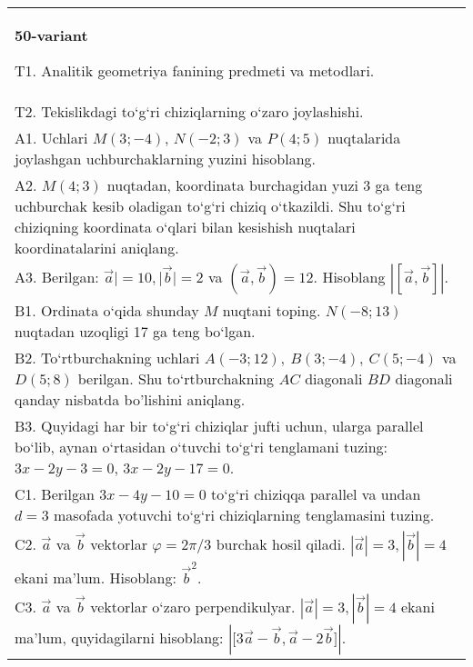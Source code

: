 \documentclass{article}
\begin{document}
\begin{tabular}{m{17cm}}
\textbf{50-variant}

T1. Analitik geometriya fanining predmeti va metodlari.
 \\
T2. 
Tekislikdagi to‘g‘ri chiziqlarning o‘zaro joylashishi.
 \\
A1. 
Uchlari $M (3;-4) $, $N (-2;3) $ va $P (4;5) $
nuqtalarida joylashgan uchburchaklarning yuzini hisoblang.
 \\
A2. 
$M (4;3) $ nuqtadan, koordinata burchagidan
yuzi 3 ga teng uchburchak kesib oladigan to‘g‘ri chiziq o‘tkazildi.
Shu to‘g‘ri chiziqning koordinata o‘qlari bilan kesishish nuqtalari
koordinatalarini aniqlang.
 \\
A3. 
Berilgan: $\overrightarrow{a}| = 10,|\overrightarrow{b}| = 2$ va
$\left(\overrightarrow{a},\overrightarrow{b} \right) = 12$. Hisoblang
$\left| \left\lbrack \overrightarrow{a},\overrightarrow{b} \right\rbrack \right|$.
 \\
B1. 
Ordinata o‘qida shunday $M$ nuqtani toping.
\(N (-8;13) \) nuqtadan uzoqligi 17 ga teng bo‘lgan.
 \\
B2. 
To‘rtburchakning uchlari
\(A (-3;12),\ B (3;-4),\ C (5;-4) \) va \(D (5;8) \) berilgan. Shu
to‘rtburchakning $AC$ diagonali $BD$ diagonali qanday
nisbatda bo'lishini aniqlang.
 \\
B3. 
Quyidagi har bir to‘g‘ri chiziqlar jufti uchun, ularga parallel
bo‘lib, aynan o‘rtasidan o‘tuvchi to‘g‘ri tenglamani tuzing: $3x-2y-3=0$, $3x-2y-17=0$.
 \\
C1. 
Berilgan \(3x-4y-10=0\) to‘g‘ri chiziqqa parallel va undan
$d=3$ masofada yotuvchi to‘g‘ri chiziqlarning tenglamasini tuzing.
 \\
C2. 
$\vec{a}$ va $\vec{b}$ vektorlar $\varphi = 2\pi/3$ burchak hosil qiladi. $|\vec{a}| = 3,|\vec{b}| = 4$ ekani ma’lum. Hisoblang:
${\vec{b}}^{2}$.
 \\
C3. 
$\vec{a}$ va $\vec{b}$ vektorlar o‘zaro perpendikulyar. $|\vec{a}| = 3,|\vec{b}| = 4$ ekani ma’lum, quyidagilarni hisoblang:
$|\lbrack 3\vec{a} - \vec{b},\vec{a}-2\vec{b}\rbrack|$.
 \\

\end{tabular}
\vspace{1cm}
\end{document}

